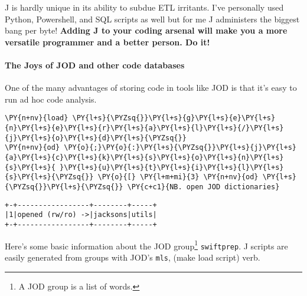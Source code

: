     J is hardly unique in its ability to subdue ETL irritants. I've
personally used Python, Powershell, and SQL scripts as well but for me J
administers the biggest bang per byte! \textbf{Adding J to your coding
arsenal will make you a more versatile programmer and a better person.
Do it!}

    \hypertarget{the-joys-of-jod-and-other-code-databases}{%
\paragraph{The Joys of JOD and other code
databases}\label{the-joys-of-jod-and-other-code-databases}}

    One of the many advantages of storing code in tools like JOD is that
it's easy to run ad hoc code analysis.

    \begin{tcolorbox}[breakable, size=fbox, boxrule=1pt, pad at break*=1mm,colback=cellbackground, colframe=cellborder]
\begin{Verbatim}[commandchars=\\\{\}]
\PY{n+nv}{load} \PY{l+s}{\PYZsq{}}\PY{l+s}{g}\PY{l+s}{e}\PY{l+s}{n}\PY{l+s}{e}\PY{l+s}{r}\PY{l+s}{a}\PY{l+s}{l}\PY{l+s}{/}\PY{l+s}{j}\PY{l+s}{o}\PY{l+s}{d}\PY{l+s}{\PYZsq{}}
\PY{n+nv}{od} \PY{o}{;}\PY{o}{:}\PY{l+s}{\PYZsq{}}\PY{l+s}{j}\PY{l+s}{a}\PY{l+s}{c}\PY{l+s}{k}\PY{l+s}{s}\PY{l+s}{o}\PY{l+s}{n}\PY{l+s}{s}\PY{l+s}{ }\PY{l+s}{u}\PY{l+s}{t}\PY{l+s}{i}\PY{l+s}{l}\PY{l+s}{s}\PY{l+s}{\PYZsq{}} \PY{o}{[} \PY{l+m+mi}{3} \PY{n+nv}{od} \PY{l+s}{\PYZsq{}}\PY{l+s}{\PYZsq{}} \PY{c+c1}{NB. open JOD dictionaries}
\end{Verbatim}
\end{tcolorbox}

    \begin{Verbatim}[commandchars=\\\{\}]
+-+-----------------+--------+-----+
|1|opened (rw/ro) ->|jacksons|utils|
+-+-----------------+--------+-----+
    \end{Verbatim}

    Here's some basic information about the JOD
group\footnote{A JOD group is a list of words.} \texttt{swiftprep}. J
scripts are easily generated from groups with JOD's \texttt{mls}, (make
load script) verb.

